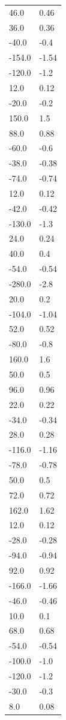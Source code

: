 \begin{longtable}{ll}
46.0 & 0.46 \\
36.0 & 0.36 \\
-40.0 & -0.4 \\
-154.0 & -1.54 \\
-120.0 & -1.2 \\
12.0 & 0.12 \\
-20.0 & -0.2 \\
150.0 & 1.5 \\
88.0 & 0.88 \\
-60.0 & -0.6 \\
-38.0 & -0.38 \\
-74.0 & -0.74 \\
12.0 & 0.12 \\
-42.0 & -0.42 \\
-130.0 & -1.3 \\
24.0 & 0.24 \\
40.0 & 0.4 \\
-54.0 & -0.54 \\
-280.0 & -2.8 \\
20.0 & 0.2 \\
-104.0 & -1.04 \\
52.0 & 0.52 \\
-80.0 & -0.8 \\
160.0 & 1.6 \\
50.0 & 0.5 \\
96.0 & 0.96 \\
22.0 & 0.22 \\
-34.0 & -0.34 \\
28.0 & 0.28 \\
-116.0 & -1.16 \\
-78.0 & -0.78 \\
50.0 & 0.5 \\
72.0 & 0.72 \\
162.0 & 1.62 \\
12.0 & 0.12 \\
-28.0 & -0.28 \\
-94.0 & -0.94 \\
92.0 & 0.92 \\
-166.0 & -1.66 \\
-46.0 & -0.46 \\
10.0 & 0.1 \\
68.0 & 0.68 \\
-54.0 & -0.54 \\
-100.0 & -1.0 \\
-120.0 & -1.2 \\
-30.0 & -0.3 \\
8.0 & 0.08 \\

\end{longtable}

